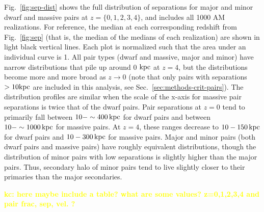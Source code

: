 \documentclass[twocolumn]{aastex631}
\newcommand{\kc}[1]{\textcolor{yellow}{\textbf{kc: #1}} }
\begin{document}
Fig.~\ref{fig:sep-dist} shows the full distribution of separations for major and minor dwarf and massive pairs at $z=\{0,1,2,3,4\}$, and includes all 1000 AM realizations. 
For reference, the median at each corresponding redshift from Fig.~\ref{fig:sep} (that is, the median of the medians of each realization) are shown in light black vertical lines.
Each plot is normalized such that the area under an individual curve is 1.
All pair types (dwarf and massive, major and minor) have narrow distributions that pile up around 0 $\mathrm{kpc}$ at $z=4$, but the distributions become more and more broad as $z\to0$ (note that only pairs with separations $>10\mathrm{kpc}$ are included in this analysis, see Sec.~\ref{sec:methods-crit-pairs}).
\linebreak
The distribution profiles are similar when the scale of the x-axis for massive pair separations is twice that of the dwarf pairs. 
Pair separations at $z=0$ tend to primarily fall between $10-\sim400\,\mathrm{kpc}$ for dwarf pairs and   between $10-\sim1000\,\mathrm{kpc}$ for massive pairs. 
At $z=4$, these ranges decrease to $10-150\,\mathrm{kpc}$ for dwarf pairs and $10-300\,\mathrm{kpc}$ for massive pairs. 
Major and minor pairs (both dwarf pairs and massive pairs) have roughly equivalent distributions, though the distribution of minor pairs with low separations is slightly higher than the major pairs. Thus, secondary halo of minor pairs tend to live slightly closer to their primaries than the  major secondaries.


\kc{here maybe include a table? what are some values?  z=0,1,2,3,4 and pair frac, sep, vel. ?}
\end{document}
